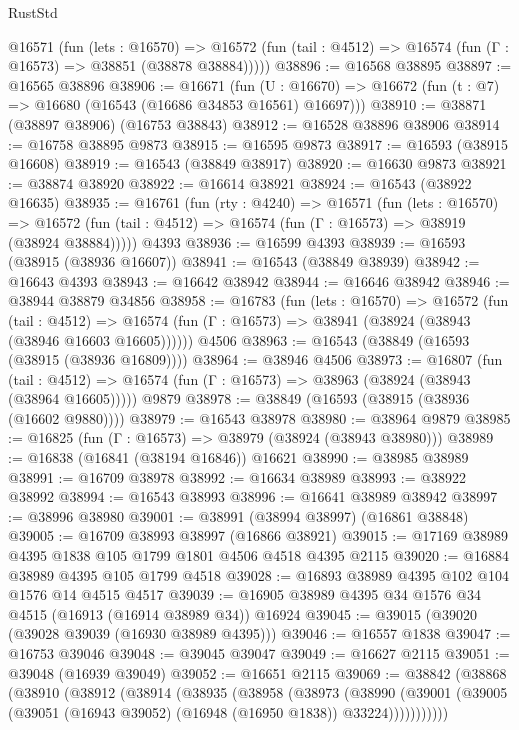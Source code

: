 \begin{lexlean}{RustStd}
\begin{coremodule}
    @16571
      (fun (lets : @16570) =>
      @16572 (fun (tail : @4512) => @16574 (fun (Γ : @16573) => @38851 (@38878 @38884)))))
@38896 := @16568 @38895
@38897 := @16565 @38896
@38906 := @16671
    (fun (U : @16670) => @16672 (fun (t : @7) => @16680 (@16543 (@16686 @34853 @16561) @16697)))
@38910 := @38871 (@38897 @38906) (@16753 @38843)
@38912 := @16528 @38896 @38906
@38914 := @16758 @38895 @9873
@38915 := @16595 @9873
@38917 := @16593 (@38915 @16608)
@38919 := @16543 (@38849 @38917)
@38920 := @16630 @9873
@38921 := @38874 @38920
@38922 := @16614 @38921
@38924 := @16543 (@38922 @16635)
@38935 := @16761
    (fun (rty : @4240) =>
    @16571
      (fun (lets : @16570) =>
      @16572 (fun (tail : @4512) => @16574 (fun (Γ : @16573) => @38919 (@38924 @38884)))))
    @4393
@38936 := @16599 @4393
@38939 := @16593 (@38915 (@38936 @16607))
@38941 := @16543 (@38849 @38939)
@38942 := @16643 @4393
@38943 := @16642 @38942
@38944 := @16646 @38942
@38946 := @38944 @38879 @34856
@38958 := @16783
    (fun (lets : @16570) =>
    @16572
      (fun (tail : @4512) =>
      @16574 (fun (Γ : @16573) => @38941 (@38924 (@38943 (@38946 @16603 @16605))))))
    @4506
@38963 := @16543 (@38849 (@16593 (@38915 (@38936 @16809))))
@38964 := @38946 @4506
@38973 := @16807
    (fun (tail : @4512) => @16574 (fun (Γ : @16573) => @38963 (@38924 (@38943 (@38964 @16605)))))
    @9879
@38978 := @38849 (@16593 (@38915 (@38936 (@16602 @9880))))
@38979 := @16543 @38978
@38980 := @38964 @9879
@38985 := @16825 (fun (Γ : @16573) => @38979 (@38924 (@38943 @38980)))
@38989 := @16838 (@16841 (@38194 @16846)) @16621
@38990 := @38985 @38989
@38991 := @16709 @38978
@38992 := @16634 @38989
@38993 := @38922 @38992
@38994 := @16543 @38993
@38996 := @16641 @38989 @38942
@38997 := @38996 @38980
@39001 := @38991 (@38994 @38997) (@16861 @38848)
@39005 := @16709 @38993 @38997 (@16866 @38921)
@39015 := @17169 @38989 @4395 @1838 @105 @1799 @1801 @4506 @4518 @4395 @2115
@39020 := @16884 @38989 @4395 @105 @1799 @4518
@39028 := @16893 @38989 @4395 @102 @104 @1576 @14 @4515 @4517
@39039 := @16905 @38989 @4395 @34 @1576 @34 @4515 (@16913 (@16914 @38989 @34)) @16924
@39045 := @39015 (@39020 (@39028 @39039 (@16930 @38989 @4395)))
@39046 := @16557 @1838
@39047 := @16753 @39046
@39048 := @39045 @39047
@39049 := @16627 @2115
@39051 := @39048 (@16939 @39049)
@39052 := @16651 @2115
@39069 := @38842
    (@38868
      (@38910
        (@38912
          (@38914
            (@38935
              (@38958
                (@38973
                  (@38990
                    (@39001
                      (@39005 (@39051 (@16943 @39052) (@16948 (@16950 @1838)) @33224)))))))))))

\end{coremodule}
\end{lexlean}
